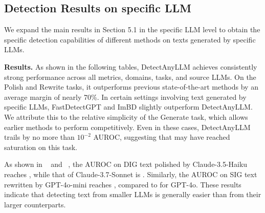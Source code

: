 \documentclass[sigconf, screen, review, anonymous]{acmart}
\newcommand{\red}[1]{\textbf{\color{orangered}{#1}}}
\begin{document}
\subsection{Detection Results on specific LLM}
We expand the main results in Section 5.1 in the specific LLM level to obtain the specific detection capabilities of different methods on texts generated by specific LLMs.

\noindent \textbf{Results. }
As shown in the following tables, DetectAnyLLM achieves consistently strong performance across all metrics, domains, tasks, and source LLMs.
%
On the Polish and Rewrite tasks, it outperforms previous state-of-the-art methods by an average margin of nearly 70\%.
%
In certain settings involving text generated by specific LLMs, FastDetectGPT\cite{fastdetectgpt} and ImBD\cite{imbd} slightly outperform DetectAnyLLM. We attribute this to the relative simplicity of the Generate task, which allows earlier methods to perform competitively.
%
Even in these cases, DetectAnyLLM trails by no more than $10^{-2}$ AUROC, suggesting that may have reached saturation on this task.

As shown in ~ and ~, the AUROC on DIG text polished by Claude-3.5-Haiku reaches \red{0.9903}, while that of Claude-3.7-Sonnet is \red{0.9096}. Similarly, the AUROC on SIG text rewritten by GPT-4o-mini reaches \red{0.9176}, compared to \red{0.8697} for GPT-4o.
%
These results indicate that detecting text from smaller LLMs is generally easier than from their larger counterparts.











\clearpage


\end{document}
